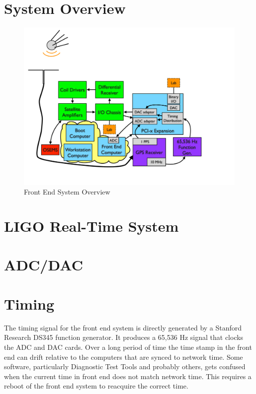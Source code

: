 
\section{System Overview}

\begin{figure}[htbp]
	\centering
		\includegraphics[width=15cm]{./figures/FrontEndSystem.pdf}
	\caption{{Front End System Overview}}
	\label{fig:front_end}
\end{figure}


\section{LIGO Real-Time System}

\section{ADC/DAC}

\section{Timing}

The timing signal for the front end system is directly generated by a Stanford Research DS345 function generator. It produces a 65,536 Hz signal that clocks the ADC and DAC cards. Over a long period of time the time stamp in the front end can drift relative to the computers that are synced to network time. Some software, particularly Diagnostic Test Tools and probably others, gets confused when the current time in front end does not match network time. This requires a reboot of the front end system to reacquire the correct time.


